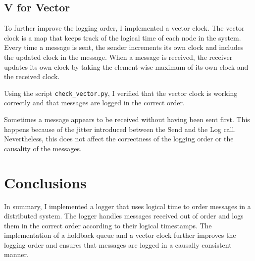 \documentclass[a4paper, 11pt]{article}
\begin{document}
\subsection{V for Vector}
To further improve the logging order, I implemented a vector clock. The vector clock is a map that keeps track of the logical time of each node in the system. Every time a message is sent, the sender increments its own clock and includes the updated clock in the message. When a message is received, the receiver updates its own clock by taking the element-wise maximum of its own clock and the received clock.

Using the script \texttt{check_vector.py}, I verified that the vector clock is working correctly and that messages are logged in the correct order.

Sometimes a message appears to be received without having been sent first. This happens because of the jitter introduced between the Send and the Log call. Nevertheless, this does not affect the correctness of the logging order or the causality of the messages.

\section{Conclusions}

In summary, I implemented a logger that uses logical time to order messages in a distributed system. The logger handles messages received out of order and logs them in the correct order according to their logical timestamps. The implementation of a holdback queue and a vector clock further improves the logging order and ensures that messages are logged in a causally consistent manner.
\end{document}
